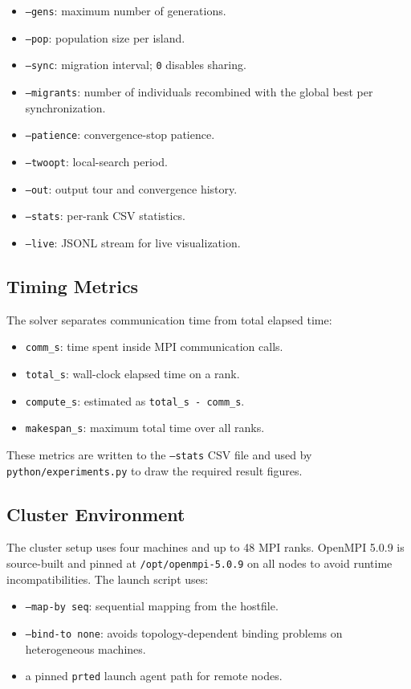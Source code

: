 \documentclass[11pt,a4paper]{article}
\begin{document}
\begin{itemize}[leftmargin=*]
  \item \texttt{--gens}: maximum number of generations.
  \item \texttt{--pop}: population size per island.
  \item \texttt{--sync}: migration interval; \texttt{0} disables sharing.
  \item \texttt{--migrants}: number of individuals recombined with the global
  best per synchronization.
  \item \texttt{--patience}: convergence-stop patience.
  \item \texttt{--twoopt}: local-search period.
  \item \texttt{--out}: output tour and convergence history.
  \item \texttt{--stats}: per-rank CSV statistics.
  \item \texttt{--live}: JSONL stream for live visualization.
\end{itemize}

\subsection{Timing Metrics}
The solver separates communication time from total elapsed time:

\begin{itemize}[leftmargin=*]
  \item \texttt{comm\_s}: time spent inside MPI communication calls.
  \item \texttt{total\_s}: wall-clock elapsed time on a rank.
  \item \texttt{compute\_s}: estimated as \texttt{total\_s - comm\_s}.
  \item \texttt{makespan\_s}: maximum total time over all ranks.
\end{itemize}

These metrics are written to the \texttt{--stats} CSV file and used by
\texttt{python/experiments.py} to draw the required result figures.

\subsection{Cluster Environment}
The cluster setup uses four machines and up to 48 MPI ranks. OpenMPI 5.0.9 is
source-built and pinned at \texttt{/opt/openmpi-5.0.9} on all nodes to avoid
runtime incompatibilities. The launch script uses:

\begin{itemize}[leftmargin=*]
  \item \texttt{--map-by seq}: sequential mapping from the hostfile.
  \item \texttt{--bind-to none}: avoids topology-dependent binding problems on
  heterogeneous machines.
  \item a pinned \texttt{prted} launch agent path for remote nodes.
\end{itemize}
\end{document}
